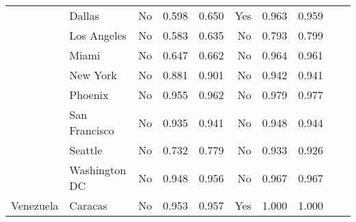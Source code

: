 \begin{tabular}{ l l l r r r l r r r }
          & Dallas &       No &  0.598 &  0.650 &      Yes &  0.963 &  0.959 \\
          & Los Angeles &       No &  0.583 &  0.635 &       No &  0.793 &  0.799 \\
          & Miami &       No &  0.647 &  0.662 &       No &  0.964 &  0.961 \\
          & New York &       No &  0.881 &  0.901 &       No &  0.942 &  0.941 \\
          & Phoenix &       No &  0.955 &  0.962 &       No &  0.979 &  0.977 \\
          & San Francisco &       No &  0.935 &  0.941 &       No &  0.948 &  0.944 \\
          & Seattle &       No &  0.732 &  0.779 &       No &  0.933 &  0.926 \\
          & Washington DC &       No &  0.948 &  0.956 &       No &  0.967 &  0.967 \\
Venezuela & Caracas &       No &  0.953 &  0.957 &      Yes &  1.000 &  1.000 \\
\bottomrule
\end{tabular}